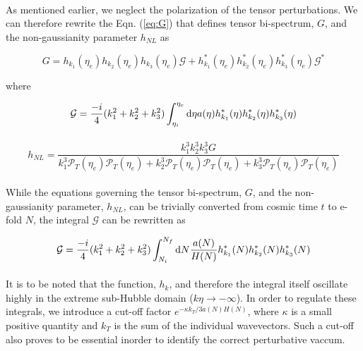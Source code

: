 \documentclass[12pt,a4paper,oneside]{book}
\begin{document}
\paragraph*{} As mentioned earlier, we neglect the polarization of the tensor perturbations. 
We can therefore rewrite the Eqn. (\ref{eq:G}) that defines tensor bi-spectrum, $G$, and 
the non-gaussianity parameter $h_{NL}$ as 

\begin{equation}\label{eqn:G_eta}
G = h_{k_1}(\eta_e)h_{k_2}(\eta_e)h_{k_3}(\eta_e)\mathcal{G} 
	+h_{k_1}^{*}(\eta_e)h_{k_2}^{*}(\eta_e)h_{k_3}^{*}(\eta_e)\mathcal{G}^{*}
\end{equation}

\noindent where

\begin{equation}\label{eqn:calG_eta}
\mathcal{G} = \frac{-i}{4}(k_1^2+k_2^2+k_3^2)\int^{\eta_e}_{\eta_i} {\rm d}\eta a(\eta) h_{k_1}^{*}(\eta)h_{k_2}^{*}(\eta)h_{k_3}^{*}(\eta)
\end{equation}

\paragraph*{} 

\begin{equation}\label{eqn:h_NL_eta}
h_{NL} = \frac{k_1^3k_2^3k_3^3G}
{k_1^3\mathcal{P}_{T}(\eta_e)\mathcal{P}_{T}(\eta_e)
+ k_2^3\mathcal{P}_{T}(\eta_e)\mathcal{P}_{T}(\eta_e)
+ k_3^3\mathcal{P}_{T}(\eta_e)\mathcal{P}_{T}(\eta_e)}
\end{equation}

\paragraph*{} While the equations governing the tensor bi-spectrum, $G$, 
and the non-gaussianity parameter, $h_{NL}$, can be trivially converted from 
cosmic time $t$ to e-fold $N$, the integral $\mathcal{G}$ can be rewritten as 

\begin{equation}\label{eqn:calG_N}
\mathcal{G} = \frac{-i}{4}(k_1^2+k_2^2+k_3^2)\int^{N_f}_{N_i} {\rm d}N \frac{a(N)}{H(N)} h_{k_1}^{*}(N)h_{k_2}^{*}(N)h_{k_3}^{*}(N)
\end{equation}

\paragraph*{} It is to be noted that the function, $h_k$, and therefore the integral itself 
oscillate highly in the extreme sub-Hubble domain ($k\eta\rightarrow -\infty$). In order to 
regulate these integrals, we introduce a cut-off factor $e^{-\kappa k_T/3a(N)H(N)}$, where 
$\kappa$ is a small positive quantity and $k_T$ is the sum of the individual wavevectors. 
Such a cut-off also proves to be essential inorder to identify the correct perturbative vaccum.
\end{document}
